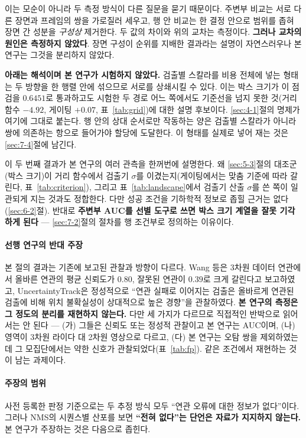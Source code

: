 \documentclass[12pt,a4paper,oneside]{report}
\begin{document}
이는 모순이 아니라 두 측정 방식이 다른 질문을 묻기 때문이다. 주변부 비교는 서로 다른 장면과 프레임의 쌍을 가로질러 세우고, 행 안 비교는 한 결정 안으로 범위를 좁혀 장면 간 성분을 \textit{구성상} 제거한다. 두 값의 차이와 위의 교차는 측정이다. \textbf{그러나 교차의 원인은 측정하지 않았다}. 장면 구성이 순위를 지배한 결과라는 설명이 자연스러우나 본 연구는 그것을 분리하지 않았다.

\textbf{아래는 해석이며 본 연구가 시험하지 않았다.} 검출별 스칼라를 비용 전체에 넣는 형태는 두 방향을 한 행렬 안에 섞으므로 서로를 상쇄시킬 수 있다. 이는 박스 크기가 이 점검을 $0.6451$로 통과하고도 시험한 두 경로 어느 쪽에서도 기준선을 넘지 못한 것(거리 함수 $-4.92$, 게이팅 $+0.07$, 표~\ref{tab:grid})에 대한 설명 후보이다. \ref{sec:4-1}절의 명제가 여기에 그대로 붙는다. 행 안의 상대 순서로만 작동하는 양은 검출별 스칼라가 아니라 쌍에 의존하는 항으로 들어가야 할당에 도달한다. 이 형태를 실제로 넣어 재는 것은 \ref{sec:7-4}절에 남긴다.

이 두 번째 결과가 본 연구의 여러 관측을 한꺼번에 설명한다. 왜 \ref{sec:5-3}절의 대조군(박스 크기)이 거리 함수에서 검출기 $\sigma$를 이겼는지(게이팅에서는 맞춤 기준에 따라 갈린다, 표~\ref{tab:criterion}), 그리고 표~\ref{tab:landscape}에서 검출기 산출 $\sigma$를 쓴 쪽이 일관되게 지는 것과도 정합한다. 다만 성공 조건을 기하학적 정보로 좁힐 근거는 없다(\ref{sec:6-2}절). 반대로 \textbf{주변부 AUC를 선별 도구로 쓰면 박스 크기 계열을 잘못 기각하게 된다} --- \ref{sec:7-2}절의 절차를 행 조건부로 정의하는 이유이다.

\paragraph{선행 연구의 반대 주장} 본 절의 결과는 기존에 보고된 관찰과 방향이 다르다. Wang 등\citep{wang2020}은 3차원 데이터 연관에서 올바른 연관의 평균 신뢰도가 $0.80$, 잘못된 연관이 $0.39$로 크게 갈린다고 보고하였고, UncertaintyTrack\citep{lee2024}은 정성적으로 ``연관 실패로 이어지는 검출은 올바르게 연관된 검출에 비해 위치 불확실성이 상대적으로 높은 경향''을 관찰하였다. \textbf{본 연구의 측정은 그 정도의 분리를 재현하지 않는다.} 다만 세 가지가 다르므로 직접적인 반박으로 읽어서는 안 된다 --- (가) 그들은 신뢰도 또는 정성적 관찰이고 본 연구는 AUC이며, (나) 영역이 3차원 라이다 대 2차원 영상으로 다르고, (다) 본 연구는 오탐 쌍을 제외하였는데 그 모집단에서는 약한 신호가 관찰되었다(표~\ref{tab:fp}). 같은 조건에서 재현하는 것이 남는 과제이다.

\paragraph{주장의 범위} 사전 등록한 판정 기준으로는 두 추정 방식 모두 ``연관 오류에 대한 정보가 없다''이다. 그러나 NMS의 시퀀스별 산포를 보면 \textbf{``전혀 없다''는 단언은 자료가 지지하지 않는다.} 본 연구가 주장하는 것은 다음으로 좁힌다.
\end{document}

